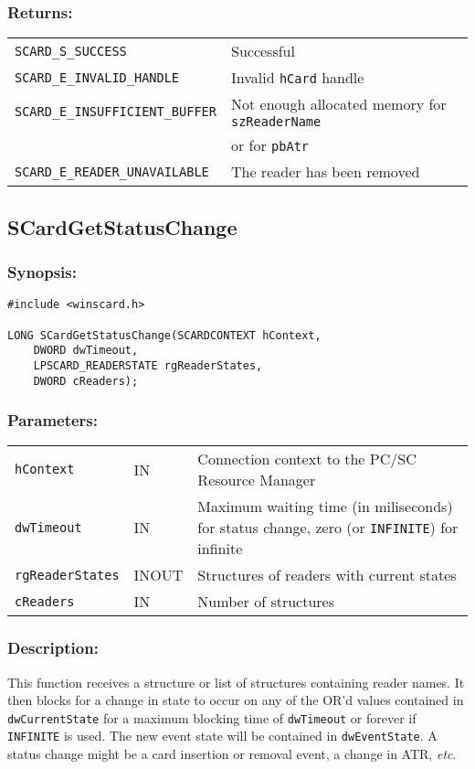 \documentclass[a4paper,12pt]{article}
\newcommand{\synopsis}{\subsubsection{Synopsis:}}
\newcommand{\parameters}{\subsubsection{Parameters:}}
\newcommand{\desc}{\subsubsection{Description:}}
\newcommand{\returns}{\subsubsection{Returns:}}
\begin{document}
\returns

\begin{tabular}{ll}
\texttt{SCARD\_S\_SUCCESS}			& Successful\\
\texttt{SCARD\_E\_INVALID\_HANDLE}		& Invalid \texttt{hCard} handle\\
\texttt{SCARD\_E\_INSUFFICIENT\_BUFFER}	& Not enough allocated memory for \texttt{szReaderName}\\
 & or for \texttt{pbAtr} \\
\texttt{SCARD\_E\_READER\_UNAVAILABLE} 	& The reader has been removed\\
\end{tabular}


\subsection{SCardGetStatusChange}

\synopsis

\begin{verbatim}
#include <winscard.h>

LONG SCardGetStatusChange(SCARDCONTEXT hContext,
    DWORD dwTimeout,
    LPSCARD_READERSTATE rgReaderStates,
    DWORD cReaders);
\end{verbatim}


\parameters

\begin{tabular}{llp{10cm}}
\texttt{hContext} &	IN &	Connection context to the PC/SC Resource Manager\\
\texttt{dwTimeout} &	IN &	Maximum waiting time (in miliseconds)
for status change, zero (or \texttt{INFINITE}) for infinite\\
\texttt{rgReaderStates} & INOUT & Structures of readers with current states\\
\texttt{cReaders} &	IN &	Number of structures\\
\end{tabular}

\desc

This function receives a structure or list of structures containing
reader names.  It then blocks for a change in state to occur on any of
the OR'd values contained in \texttt{dwCurrentState} for a maximum
blocking time of \texttt{dwTimeout} or forever if \texttt{INFINITE} is
used.  The new event state will be contained in \texttt{dwEventState}.
A status change might be a card insertion or removal event, a change in
ATR, \textit{etc}.
\end{document}
